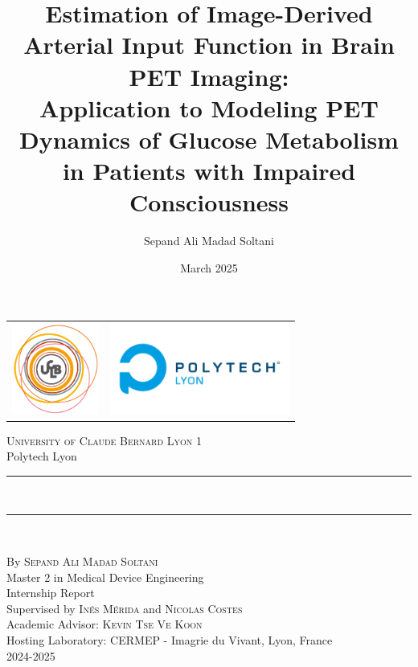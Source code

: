 \documentclass[a4paper,12pt,twoside,english,openany]{book}
\title{Estimation of Image-Derived Arterial Input Function in Brain PET Imaging: \\ Application to Modeling PET Dynamics of Glucose Metabolism in Patients with Impaired Consciousness}
\author{Sepand Ali Madad Soltani}
\date{March 2025}
\begin{document}
\begin{titlepage}
	\begin{center}
		\begin{tabular}{c@{\hskip 7cm}c@{\hskip 1cm}}
			\includegraphics[height=3cm]{res/ucbl.png} &
			\includegraphics[height=3cm]{res/polytech.png}
		\end{tabular}
	\end{center}

	\begin{center}

		\vspace*{.03\textheight}
		\textsc{\Large University of Claude Bernard Lyon 1}\\[0.2cm]
		\large Polytech Lyon

		\rule{\textwidth}{0.8pt} \\
		\vspace{10pt}

		{\Large \bfseries \thetitle}
		\rule{\textwidth}{0.8pt} \\


		\vfill
		By \textsc{\Large Sepand Ali Madad Soltani}\\[1cm]
		Master 2 in Medical Device Engineering \\
		Internship Report\\[1.2cm]
		Supervised by \textsc{\large Inés Mérida}
		and
		\textsc{\large Nicolas Costes}  \\[0.2cm]
		Academic Advisor: \textsc{\large Kevin Tse Ve Koon}\\[0.2cm]
		Hosting Laboratory: CERMEP - Imagrie du Vivant, Lyon, France\\
		2024-2025

	\end{center}

	\vspace{1cm}
\end{titlepage}
\end{document}
